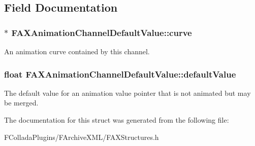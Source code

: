 \subsection{Field Documentation}
\hypertarget{structFAXAnimationChannelDefaultValue_aa2acbd5661a378862458fd0e392c8dec}{
\subsubsection[{curve}]{$\ast$ {\bf FAXAnimationChannelDefaultValue::curve}}}
\label{structFAXAnimationChannelDefaultValue_aa2acbd5661a378862458fd0e392c8dec}
An animation curve contained by this channel. \hypertarget{structFAXAnimationChannelDefaultValue_a03faf32f6146a54daa1902baf93edde4}{
\subsubsection[{defaultValue}]{\setlength{\rightskip}{0pt plus 5cm}float {\bf FAXAnimationChannelDefaultValue::defaultValue}}}
\label{structFAXAnimationChannelDefaultValue_a03faf32f6146a54daa1902baf93edde4}
The default value for an animation value pointer that is not animated but may be merged. 

The documentation for this struct was generated from the following file:\begin{DoxyCompactItemize}
\item 
FColladaPlugins/FArchiveXML/FAXStructures.h\end{DoxyCompactItemize}
